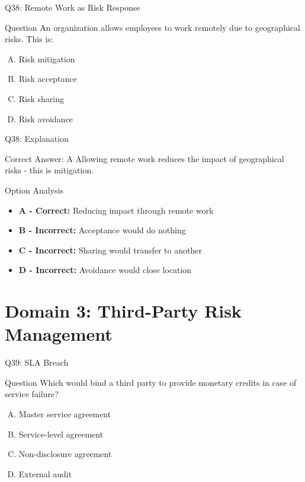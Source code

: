 \documentclass{beamer}
\begin{document}
	\begin{frame}{Q38: Remote Work as Risk Response}
		\begin{block}{Question}
			An organization allows employees to work remotely due to geographical risks. This is:
		\end{block}
		\begin{enumerate}[(A)]
			\item Risk mitigation
			\item Risk acceptance
			\item Risk sharing
			\item Risk avoidance
		\end{enumerate}
	\end{frame}
	
	\begin{frame}{Q38: Explanation}
		\begin{block}{Correct Answer: A}
			Allowing remote work reduces the impact of geographical risks - this is mitigation.
		\end{block}
		\begin{block}{Option Analysis}
			\begin{itemize}
				\item \textbf{A - Correct:} Reducing impact through remote work
				\item \textbf{B - Incorrect:} Acceptance would do nothing
				\item \textbf{C - Incorrect:} Sharing would transfer to another
				\item \textbf{D - Incorrect:} Avoidance would close location
			\end{itemize}
		\end{block}
	\end{frame}
	
	\section{Domain 3: Third-Party Risk Management}
	
	\begin{frame}{Q39: SLA Breach}
		\begin{block}{Question}
			Which would bind a third party to provide monetary credits in case of service failure?
		\end{block}
		\begin{enumerate}[(A)]
			\item Master service agreement
			\item Service-level agreement
			\item Non-disclosure agreement
			\item External audit
		\end{enumerate}
	\end{frame}
	
\end{document}
